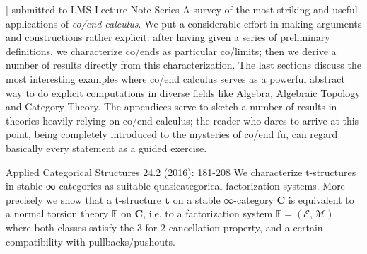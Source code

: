 \begin{eyenumerate}
   \item {}
   { | submitted to LMS Lecture Note Series}
   {A survey of the most striking and useful applications of \emph{co/end calculus}. We put a considerable effort in making arguments and constructions rather explicit: after having given a series of preliminary definitions, we characterize co/ends as particular co/limits; then we derive a number of results directly from this characterization. The last sections discuss the most interesting examples where co/end calculus serves as a powerful abstract way to do explicit computations in diverse fields like Algebra, Algebraic Topology and Category Theory. The appendices serve to sketch a number of results in theories heavily relying on co/end calculus; the reader who dares to arrive at this point, being completely introduced to the mysteries of co/end fu, can regard basically every statement as a guided exercise.}
   \item {}
   {Applied Categorical Structures 24.2 (2016): 181-208}
   {We characterize t-structures in stable ∞-categories as suitable quasicategorical factorization systems. More precisely we show that a t-structure $\texttt{t}$ on a stable ∞-category $\textbf{C}$ is equivalent to a normal torsion theory $\mathbb{F}$ on $\textbf{C}$, i.e. to a factorization system $\mathbb{F}=(\mathcal{E},\mathcal{M})$ where both classes satisfy the 3-for-2 cancellation property, and a certain compatibility with pullbacks/pushouts.}
\end{eyenumerate}
